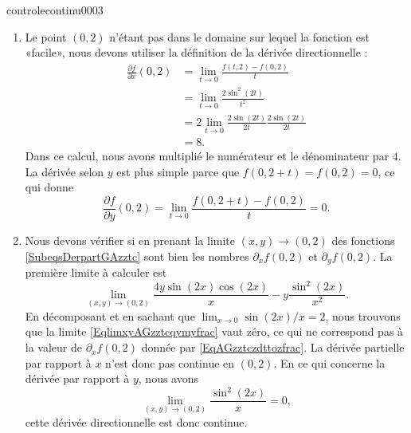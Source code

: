 \begin{corrige}{controlecontinu0003}
\begin{enumerate}
            \item
                Le point \( (0,2)\) n'étant pas dans le domaine sur lequel la fonction est «facile», nous devons utiliser la définition de la dérivée directionnelle :
                \begin{subequations}
                    \begin{align}
                        \frac{ \partial f }{ \partial x }(0,2)&=\lim_{t\to 0} \frac{ f(t,2)-f(0,2) }{ t }\\
                        &=\lim_{t\to 0} \frac{ 2\sin^2(2t) }{ t^2 }\\
                        &=2\lim_{t\to 0} \frac{ 2\sin(2t) }{ 2t }\frac{ 2\sin(2t) }{ 2t }\\
                        &=8.
                    \end{align}
                \end{subequations}
                Dans ce calcul, nous avons multiplié le numérateur et le dénominateur par \( 4\). La dérivée selon \( y\) est plus simple parce que \( f(0,2+t)=f(0,2)=0\), ce qui donne
                \begin{equation}        \label{EqAGzztczdttozfrac}
                    \frac{ \partial f }{ \partial y }(0,2)=\lim_{t\to 0} \frac{ f(0,2+t)-f(0,2) }{ t }=0.
                \end{equation}

            \item
                Nous devons vérifier si en prenant la limite \( (x,y)\to(0,2)\) des fonctions \eqref{SubeqsDerpartGAzztc} sont bien les nombres \( \partial_xf(0,2)\) et \( \partial_yf(0,2)\). La première limite à calculer est
                \begin{equation}        \label{EqlimxyAGzztcqymyfrac}
                    \lim_{(x,y)\to(0,2)}\frac{ 4y\sin(2x)\cos(2x) }{ x }-y\frac{ \sin^2(2x) }{ x^2 }.
                \end{equation}
                En décomposant et en sachant que \( \lim_{x\to 0} \sin(2x)/x=2\), nous trouvons que la limite \eqref{EqlimxyAGzztcqymyfrac} vaut zéro, ce qui ne correspond pas à la valeur de \( \partial_xf(0,2)\) donnée par \eqref{EqAGzztczdttozfrac}. La dérivée partielle par rapport à \( x\) n'est donc pas continue en \( (0,2)\). En ce qui concerne la dérivée par rapport à \( y\), nous avons
                \begin{equation}
                    \lim_{(x,y)\to(0,2)}\frac{ \sin^2(2x) }{ x }=0,
                \end{equation}
                cette dérivée directionnelle est donc continue.

    \end{enumerate}

\end{corrige}
